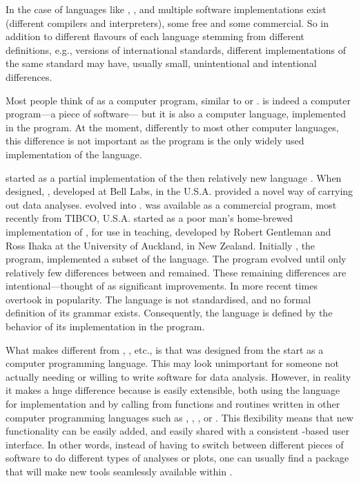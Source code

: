 \documentclass[krantz2]{krantz}\usepackage{knitr}
\begin{document}
In the case of languages like \Cpplang, \Clang, \pascallang and  multiple software implementations exist (different compilers and interpreters), some free and some commercial. So in addition to different flavours of each language stemming from different definitions, e.g., versions of international standards, different implementations of the same standard may have, usually small, unintentional and intentional differences.

Most people think
of \Rpgrm as a computer program, similar to  or . \Rpgrm is indeed a computer program---a piece of software--- but it is also a computer language, implemented in the \Rpgrm program. At the moment, differently to most other computer languages, this difference is not important as the \Rpgrm program is the only widely used implementation of the \Rlang language.

\Rlang started as a partial implementation of the then relatively new \Slang language \autocite{Becker1984,Becker1988}. When designed, \Slang, developed at Bell Labs, in the U.S.A. provided a novel way of carrying out data analyses. \Slang evolved into \Splang \autocite{Becker1988}. \Splang was available as a commercial program, most recently from TIBCO, U.S.A. \Rlang started as a poor man's home-brewed implementation of \Slang, for use in teaching, developed by Robert Gentleman and Ross Ihaka at the University of Auckland, in New Zealand. Initially \Rpgrm, the program, implemented a subset of the \Slang language. The \Rpgrm program evolved until only relatively few differences between \Slang and \Rlang remained. These remaining differences are intentional---thought of as significant improvements. In more recent times \Rlang overtook \Splang in popularity. The \Rlang language is not standardised, and no formal definition of its grammar exists. Consequently, the \Rlang language is defined by the behavior of its implementation in the \Rpgrm program.

What makes \Rlang different from , , etc., is that \Slang was designed from the start as a computer programming language. This may look unimportant for someone not actually needing or willing to write software for data analysis. However, in reality it makes a huge difference because \Rlang is easily extensible, both using the \Rlang language for implementation and by calling from \Rlang functions and routines written in other computer programming languages such as \Clang, \Cpplang, , \pythonlang or \javalang. This flexibility means that new functionality can be easily added, and easily shared with a consistent \Rlang-based user interface. In other words, instead of having to switch between different pieces of software to do different types of analyses or plots, one can usually find a package that will make new tools seamlessly available within \Rlang.
\end{document}
